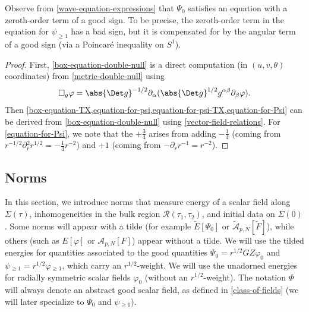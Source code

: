 \documentclass[10pt, reqno]{amsart}
\begin{document}
\begin{remark}
Observe from \cref{wave-equation-expressions} that \(\Psi{}_0\) satisfies an
equation with a zeroth-order term of a good sign. To be precise, the
zeroth-order term in the equation for \(\psi_{\ge 1}\) has a bad sign, but it is
compensated for by the angular term of a good sign (via a Poincaré inequality on \(S^1\)).
\end{remark}
\begin{proof}
First, \cref{box-equation-double-null} is a direct computation (in \((u,v,\theta{})\)
coordinates) from \cref{metric-double-null} using
\begin{equation}
\Box_g\varphi{} = \abs{\Det g}^{-1/2}\partial_\alpha{}(\abs{\Det g}^{1/2}g^{\alpha{}\beta{}}\partial_\beta{}\varphi{}).
\end{equation}
Then \cref{box-equation-TX,equation-for-psi,equation-for-psi-TX,equation-for-Psi}
can be derived from \cref{box-equation-double-null} using
\cref{vector-field-relations}. For \cref{equation-for-Psi}, we note that the \(+
\frac{3}{4}\) arises from adding \(-\frac{1}{4}\) (coming from
\(r^{-1/2}\partial{}_r^2r^{1/2} = -\frac{1}{4}r^{-2}\)) and \(+ 1\) (coming from
\(-\partial{}_rr^{-1} = r^{-2}\)).
\end{proof}
\subsection{Norms}
In this section, we introduce norms that measure energy of a scalar field along
\(\Sigma{}(\tau{})\), inhomogeneities in the bulk region
\(\mathcal{R}(\tau_1,\tau_2)\), and initial data on \(\Sigma{}(0)\). Some norms
will appear with a tilde (for example \(\tilde{E}[\Psi{}_0]\) or
\(\tilde{\mathcal{A}}_{p,N}[\tilde{F}]\)), while others (such as
\(E[\varphi{}]\) or \(\mathcal{A}_{p,N}[F]\)) appear without a tilde. We will
use the tilded energies for quantities associated to the good quantities
\(\Psi{}_0 = r^{1/2}GZ\varphi_0\) and \(\psi{}_{\ge 1} = r^{1/2}\varphi{}_{\ge
1}\), which carry an \(r^{1/2}\)-weight. We will use the unadorned energies for
radially symmetric scalar fields \(\varphi_0\) (without an \(r^{1/2}\)-weight).
The notation \(\Phi{}\) will always denote an abstract good scalar field, as
defined in \cref{class-of-fields} (we will later specialize to \(\Psi_0\) and \(\psi{}_{\ge
1}\)).
\end{document}
